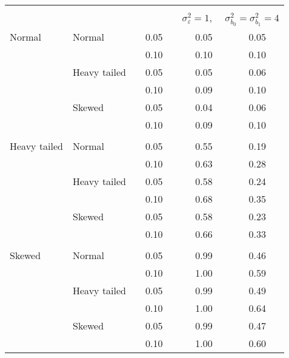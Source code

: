 \begin{table}[ht]
\begin{center}
\begin{scriptsize}
\begin{tabular}{ll p{.1cm} c p{.1cm} cc}
&&&&&&\\
  & && && \multicolumn{2}{c}{$\sigma_{\varepsilon}^2 = 1$, \ \ $\sigma_{b_0}^2 = \sigma_{b_1}^2 = 4$} \\ \cline{6-7}
\rowcolor{gray!20}Normal       & Normal       && 0.05 &&  0.05 & 0.05 \\ 
\rowcolor{gray!20}             &              && 0.10 &&  0.10 & 0.10 \\ 
\rowcolor{gray!20}             & Heavy tailed && 0.05 &&  0.05 & 0.06 \\ 
\rowcolor{gray!20}             &              && 0.10 &&  0.09 & 0.10 \\ 
\rowcolor{gray!20}             & Skewed       && 0.05 &&  0.04 & 0.06 \\ 
\rowcolor{gray!20}             &              && 0.10 &&  0.09 & 0.10 \\ 
             &&&&&&\\
Heavy tailed & Normal       && 0.05 &&  0.55 & 0.19 \\ 
             &              && 0.10 &&  0.63 & 0.28 \\ 
             & Heavy tailed && 0.05 &&  0.58 & 0.24 \\ 
             &              && 0.10 &&  0.68 & 0.35 \\ 
             & Skewed       && 0.05 &&  0.58 & 0.23 \\ 
             &              && 0.10 &&  0.66 & 0.33 \\ 
             &&&&&&\\
Skewed       & Normal       && 0.05 &&  0.99 & 0.46 \\ 
             &              && 0.10 &&  1.00 & 0.59 \\ 
             & Heavy tailed && 0.05 &&  0.99 & 0.49 \\ 
             &              && 0.10 &&  1.00 & 0.64 \\ 
             & Skewed       && 0.05 &&  0.99 & 0.47 \\ 
             &              && 0.10 &&  1.00 & 0.60 \\ 


   \hline
\end{tabular}
\end{scriptsize}
\end{center}
\end{table}